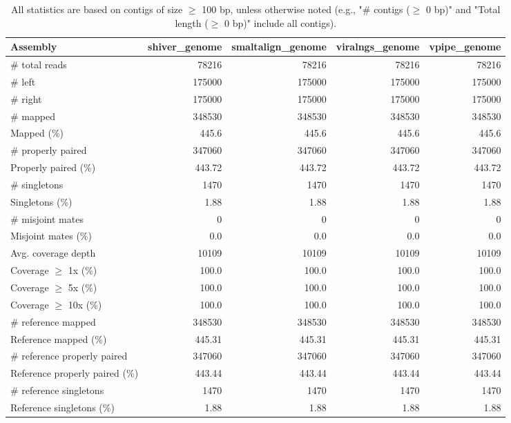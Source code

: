 \documentclass[12pt,a4paper]{article}
\begin{document}
\begin{table}[ht]
\begin{center}
\caption{All statistics are based on contigs of size $\geq$ 100 bp, unless otherwise noted (e.g., "\# contigs ($\geq$ 0 bp)" and "Total length ($\geq$ 0 bp)" include all contigs).}
\begin{tabular}{|l*{4}{|r}|}
\hline
Assembly & shiver\_genome & smaltalign\_genome & viralngs\_genome & vpipe\_genome \\ \hline
\# total reads & 78216 & 78216 & 78216 & 78216 \\ \hline
\# left & 175000 & 175000 & 175000 & 175000 \\ \hline
\# right & 175000 & 175000 & 175000 & 175000 \\ \hline
\# mapped & 348530 & 348530 & 348530 & 348530 \\ \hline
Mapped (\%) & 445.6 & 445.6 & 445.6 & 445.6 \\ \hline
\# properly paired & 347060 & 347060 & 347060 & 347060 \\ \hline
Properly paired (\%) & 443.72 & 443.72 & 443.72 & 443.72 \\ \hline
\# singletons & 1470 & 1470 & 1470 & 1470 \\ \hline
Singletons (\%) & 1.88 & 1.88 & 1.88 & 1.88 \\ \hline
\# misjoint mates & 0 & 0 & 0 & 0 \\ \hline
Misjoint mates (\%) & 0.0 & 0.0 & 0.0 & 0.0 \\ \hline
Avg. coverage depth & 10109 & 10109 & 10109 & 10109 \\ \hline
Coverage $\geq$ 1x (\%) & 100.0 & 100.0 & 100.0 & 100.0 \\ \hline
Coverage $\geq$ 5x (\%) & 100.0 & 100.0 & 100.0 & 100.0 \\ \hline
Coverage $\geq$ 10x (\%) & 100.0 & 100.0 & 100.0 & 100.0 \\ \hline
\# reference mapped & 348530 & 348530 & 348530 & 348530 \\ \hline
Reference mapped (\%) & 445.31 & 445.31 & 445.31 & 445.31 \\ \hline
\# reference properly paired & 347060 & 347060 & 347060 & 347060 \\ \hline
Reference properly paired (\%) & 443.44 & 443.44 & 443.44 & 443.44 \\ \hline
\# reference singletons & 1470 & 1470 & 1470 & 1470 \\ \hline
Reference singletons (\%) & 1.88 & 1.88 & 1.88 & 1.88 \\ \hline

\end{tabular}
\end{center}
\end{table}
\end{document}
